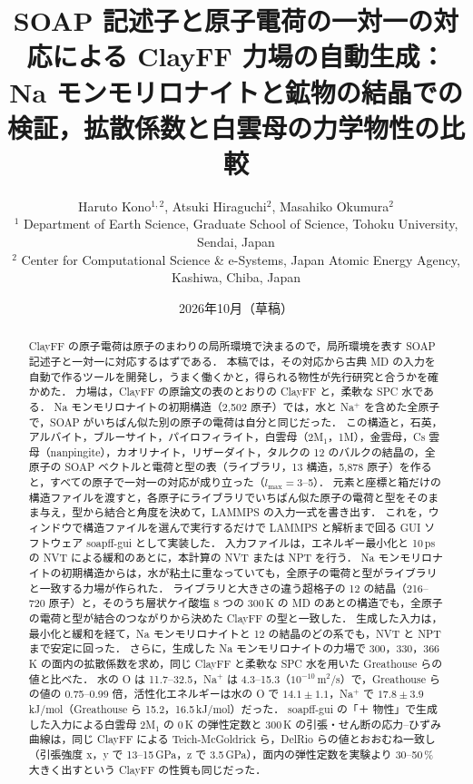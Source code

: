 \documentclass[a4paper,11pt]{article}
\title{SOAP 記述子と原子電荷の一対一の対応による ClayFF 力場の自動生成：\\Na モンモリロナイトと鉱物の結晶での検証，拡散係数と白雲母の力学物性の比較}
\author{Haruto Kono$^{1,2}$, Atsuki Hiraguchi$^{2}$, Masahiko Okumura$^{2}$\\[4pt]
{\small $^{1}$ Department of Earth Science, Graduate School of Science, Tohoku University, Sendai, Japan}\\
{\small $^{2}$ Center for Computational Science \& e-Systems, Japan Atomic Energy Agency, Kashiwa, Chiba, Japan}}
\date{2026年10月（草稿）}
\begin{document}
\maketitle

\begin{abstract}
ClayFF の原子電荷は原子のまわりの局所環境で決まるので，局所環境を表す SOAP 記述子と一対一に対応するはずである．
本稿では，その対応から古典 MD の入力を自動で作るツールを開発し，うまく働くかと，得られる物性が先行研究と合うかを確かめた．
力場は，ClayFF の原論文の表のとおりの ClayFF と，柔軟な SPC 水である．
Na モンモリロナイトの初期構造（2{,}502 原子）では，水と Na$^+$ を含めた全原子で，SOAP がいちばん似た別の原子の電荷は自分と同じだった．
この構造と，石英，アルバイト，ブルーサイト，パイロフィライト，白雲母（2M$_1$，1M），金雲母，Cs 雲母（nanpingite），カオリナイト，リザーダイト，タルクの 12 のバルクの結晶の，全原子の SOAP ベクトルと電荷と型の表（ライブラリ，13 構造，5{,}878 原子）を作ると，すべての原子で一対一の対応が成り立った（$l_{\max}=3$--5）．
元素と座標と箱だけの構造ファイルを渡すと，各原子にライブラリでいちばん似た原子の電荷と型をそのまま与え，型から結合と角度を決めて，LAMMPS の入力一式を書き出す．
これを，ウィンドウで構造ファイルを選んで実行するだけで LAMMPS と解析まで回る GUI ソフトウェア soapff-gui として実装した．
入力ファイルは，エネルギー最小化と 10\,ps の NVT による緩和のあとに，本計算の NVT または NPT を行う．
Na モンモリロナイトの初期構造からは，水が粘土に重なっていても，全原子の電荷と型がライブラリと一致する力場が作られた．
ライブラリと大きさの違う超格子の 12 の結晶（216--720 原子）と，そのうち層状ケイ酸塩 8 つの 300\,K の MD のあとの構造でも，全原子の電荷と型が結合のつながりから決めた ClayFF の型と一致した．
生成した入力は，最小化と緩和を経て，Na モンモリロナイトと 12 の結晶のどの系でも，NVT と NPT まで安定に回った．
さらに，生成した Na モンモリロナイトの力場で 300，330，366\,K の面内の拡散係数を求め，同じ ClayFF と柔軟な SPC 水を用いた Greathouse ら\cite{greathouse2016}の値と比べた．
水の O は 11.7--32.5，Na$^+$ は 4.3--15.3（$10^{-10}$\,m$^2$/s）で，Greathouse らの値の 0.75--0.99 倍，活性化エネルギーは水の O で $14.1\pm1.1$，Na$^+$ で $17.8\pm3.9$\,kJ/mol（Greathouse ら 15.2，16.5\,kJ/mol）だった．
soapff-gui の「＋ 物性」で生成した入力による白雲母 2M$_1$ の 0\,K の弾性定数と 300\,K の引張・せん断の応力--ひずみ曲線は，同じ ClayFF による Teich-McGoldrick ら\cite{teich2012}，DelRio ら\cite{delrio2026}の値とおおむね一致し（引張強度 x，y で 13--15\,GPa，z で 3.5\,GPa），面内の弾性定数を実験より 30--50\,\% 大きく出すという ClayFF の性質も同じだった．
\end{abstract}
\end{document}
